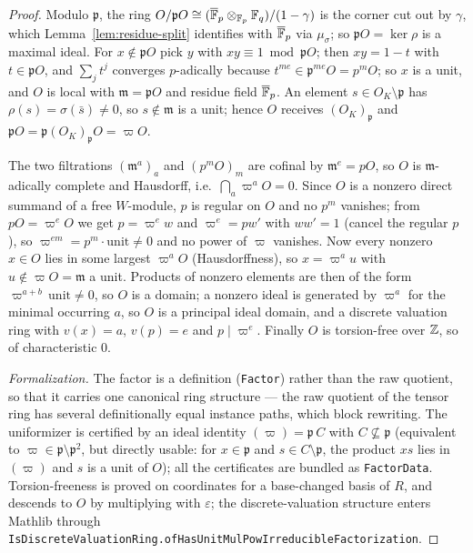 \begin{proof}
\leanok
Modulo $\mathfrak p$, the ring $O/\mathfrak p O \cong
(\overline{\mathbb{F}}_p \otimes_{\mathbb{F}_p} \mathbb{F}_q)/(1-\gamma)$ is the corner cut out by $\gamma$, which
Lemma~\ref{lem:residue-split} identifies with $\overline{\mathbb{F}}_p$ via $\mu_\sigma$; so
$\mathfrak p O = \ker \rho$ is a maximal ideal. For $x \notin \mathfrak p O$ pick $y$
with $xy \equiv 1 \bmod \mathfrak p O$; then $xy = 1 - t$ with $t \in \mathfrak p O$, and
$\sum_j t^j$ converges $p$-adically because $t^{me} \in \mathfrak p^{me} O = p^m O$; so
$x$ is a unit, and $O$ is local with $\mathfrak m = \mathfrak p O$ and residue field
$\overline{\mathbb{F}}_p$. An element $s \in O_K \setminus \mathfrak p$ has $\rho(s) = \sigma(\bar s)
\neq 0$, so $s \notin \mathfrak m$ is a unit; hence $O$ receives $(O_K)_{\mathfrak p}$
and $\mathfrak p O = \mathfrak p (O_K)_{\mathfrak p} O = \varpi O$.

The two filtrations $(\mathfrak m^a)_a$ and $(p^m O)_m$ are cofinal by
$\mathfrak m^e = pO$, so $O$ is $\mathfrak m$-adically complete and Hausdorff, i.e.\
$\bigcap_a \varpi^a O = 0$. Since $O$ is a nonzero direct summand of a free $W$-module,
$p$ is regular on $O$ and no $p^m$ vanishes; from $pO = \varpi^e O$ we get
$p = \varpi^e w$ and $\varpi^e = p w'$ with $w w' = 1$ (cancel the regular $p$), so
$\varpi^{em} = p^m \cdot \mathrm{unit} \neq 0$ and no power of $\varpi$ vanishes. Now
every nonzero $x \in O$ lies in some largest $\varpi^a O$ (Hausdorffness), so
$x = \varpi^a u$ with $u \notin \varpi O = \mathfrak m$ a unit. Products of nonzero
elements are then of the form $\varpi^{a+b}\,\mathrm{unit} \neq 0$, so $O$ is a domain;
a nonzero ideal is generated by $\varpi^a$ for the minimal occurring $a$, so $O$ is a
principal ideal domain, and a discrete valuation ring with $v(x) = a$, $v(p) = e$ and
$p \mid \varpi^e$. Finally $O$ is torsion-free over $\mathbb{Z}$, so of characteristic $0$.

\emph{Formalization.} The factor is a definition (\texttt{Factor}) rather than the raw
quotient, so that it carries one canonical ring structure --- the raw quotient of the
tensor ring has several definitionally equal instance paths, which block rewriting. The
uniformizer is certified by an ideal identity $(\varpi) = \mathfrak p\,C$ with
$C \not\subseteq \mathfrak p$ (equivalent to $\varpi \in \mathfrak p \setminus
\mathfrak p^2$, but directly usable: for $x \in \mathfrak p$ and $s \in C \setminus
\mathfrak p$, the product $xs$ lies in $(\varpi)$ and $s$ is a unit of $O$); all the
certificates are bundled as \texttt{FactorData}. Torsion-freeness is proved on
coordinates for a base-changed basis of $R$, and descends to $O$ by multiplying with
$\varepsilon$; the discrete-valuation structure enters Mathlib through
\texttt{IsDiscreteValuationRing.ofHasUnitMulPowIrreducibleFactorization}.
\end{proof}

